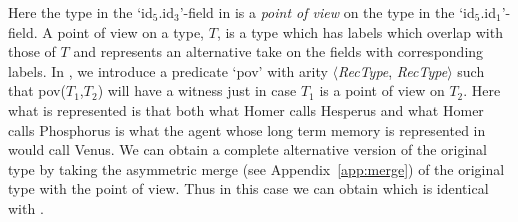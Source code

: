  Here the type in the `id$_5$.id$_3$'-field in \preveg{} is a
\textit{point of view} on the type in the `id$_5$.id$_1$'-field.  A
point of view on a type, $T$, is a type which has labels which overlap
with those of $T$ and represents an alternative take on the fields
with corresponding labels.  In \preveg{}, we introduce a predicate `pov' with arity
$\langle$\textit{RecType}, \textit{RecType}$\rangle$ such that
pov($T_1$,$T_2$) will have a witness just in case $T_1$ is a point of
view on $T_2$.  Here what is represented is that both what Homer calls
Hesperus and what Homer calls Phosphorus is what the agent whose long
term memory is represented in \preveg{} would call Venus.  We can
obtain a complete alternative version of the original type by taking
the asymmetric merge (see Appendix~\ref{app:merge}) of the original
type with the point of view.  Thus in this case we can obtain
 which is identical with .

